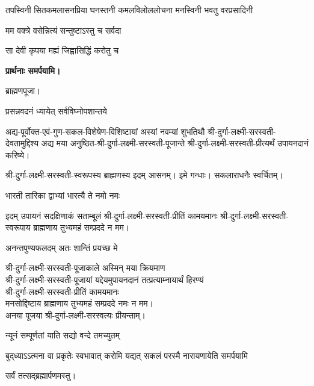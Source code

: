 \begin{center}
{तपस्विनी सितकमलासनप्रिया}
{घनस्तनी कमलविलोललोचना}
{मनस्विनी भवतु वरप्रसादिनी}

{मम वक्त्रे वसेन्नित्यं सन्तुष्टाऽस्तु च सर्वदा}

{सा देवी कृपया मह्यं जिह्वासिद्धिं करोतु च}

\textbf{प्रार्थनाः समर्पयामि।}

ब्राह्मणपूजा।

{प्रसन्नवदनं ध्यायेत् सर्वविघ्नोपशान्तये}

अद्य-पूर्वोक्त-एवं-गुण-सकल-विशेषेण-विशिष्टायां अस्यां नवम्यां शुभतिथौ श्री-दुर्गा-लक्ष्मी-सरस्वती-देवतामुद्दिश्य अद्य मया अनुष्ठित-श्री-दुर्गा-लक्ष्मी-सरस्वती-पूजान्ते  
श्री-दुर्गा-लक्ष्मी-सरस्वती-प्रीत्यर्थं उपायनदानं करिष्ये।

श्री-दुर्गा-लक्ष्मी-सरस्वती-स्वरूपस्य ब्राह्मणस्य इदम् आसनम्। इमे गन्धाः। सकलाराधनैः स्वर्चितम्।

{भारती तारिका द्वाभ्यां भारत्यै ते नमो नमः}

इदम् उपायनं सदक्षिणाकं सताम्बूलं श्री-दुर्गा-लक्ष्मी-सरस्वती-प्रीतिं कामयमानः श्री-दुर्गा-लक्ष्मी-सरस्वती-स्वरूपाय ब्राह्मणाय तुभ्यमहं सम्प्रददे न मम।

{अनन्तपुण्यफलदम् अतः शान्तिं प्रयच्छ मे}

श्री-दुर्गा-लक्ष्मी-सरस्वती-पूजाकाले अस्मिन् मया क्रियमाण\\
श्री-दुर्गा-लक्ष्मी-सरस्वती-पूजायां यद्देयमुपायनदानं तत्प्रत्याम्नायार्थं हिरण्यं\\
श्री-दुर्गा-लक्ष्मी-सरस्वती-प्रीतिं कामयमानः\\
मनसोद्दिष्टाय ब्राह्मणाय तुभ्यमहं सम्प्रददे नमः न मम।\\ 
अनया पूजया श्री-दुर्गा-लक्ष्मी-सरस्वत्यः प्रीयन्ताम्। 
\end{center}


{न्यूनं सम्पूर्णतां याति सद्यो वन्दे तमच्युतम्}

{बुद्‌ध्याऽऽत्मना वा प्रकृतेः स्वभावात्}
{करोमि यद्यत् सकलं परस्मै}
{नारायणायेति समर्पयामि}

\centerline{सर्वं तत्सद्ब्रह्मार्पणमस्तु।}

\closesub

 

\closesection